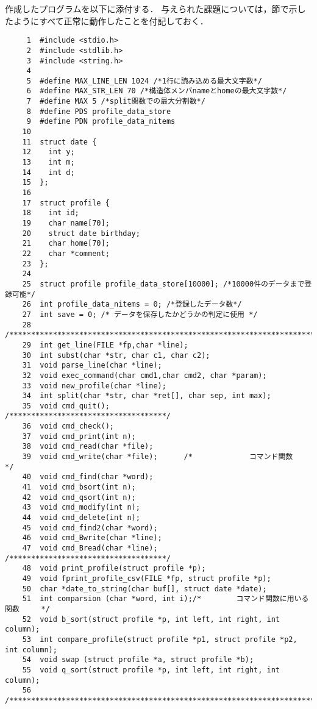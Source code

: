 \documentclass[a4paper,11pt]{jarticle}
\begin{document}
作成したプログラムを以下に添付する．
与えられた課題については，節で示したようにすべて正常に動作したことを付記しておく．
{\fontsize{10pt}{11pt} \selectfont
\begin{verbatim}
     1  #include <stdio.h>
     2  #include <stdlib.h>
     3  #include <string.h>
     4  
     5  #define MAX_LINE_LEN 1024 /*1行に読み込める最大文字数*/
     6  #define MAX_STR_LEN 70 /*構造体メンバnameとhomeの最大文字数*/
     7  #define MAX 5 /*split関数での最大分割数*/
     8  #define PDS profile_data_store
     9  #define PDN profile_data_nitems
    10  
    11  struct date {
    12    int y;
    13    int m;
    14    int d;
    15  };
    16  
    17  struct profile {
    18    int id;
    19    char name[70];
    20    struct date birthday;
    21    char home[70];
    22    char *comment;
    23  };
    24  
    25  struct profile profile_data_store[10000]; /*10000件のデータまで登録可能*/
    26  int profile_data_nitems = 0; /*登録したデータ数*/
    27  int save = 0; /* データを保存したかどうかの判定に使用 */
    28  /*************************************************************************/
    29  int get_line(FILE *fp,char *line);
    30  int subst(char *str, char c1, char c2);
    31  void parse_line(char *line);     
    32  void exec_command(char cmd1,char cmd2, char *param);
    33  void new_profile(char *line);
    34  int split(char *str, char *ret[], char sep, int max);
    35  void cmd_quit();                 /************************************/ 
    36  void cmd_check();
    37  void cmd_print(int n);
    38  void cmd_read(char *file);
    39  void cmd_write(char *file);      /*             コマンド関数           */
    40  void cmd_find(char *word);
    41  void cmd_bsort(int n);
    42  void cmd_qsort(int n);
    43  void cmd_modify(int n);
    44  void cmd_delete(int n);
    45  void cmd_find2(char *word);
    46  void cmd_Bwrite(char *line);
    47  void cmd_Bread(char *line);     /************************************/
    48  void print_profile(struct profile *p);
    49  void fprint_profile_csv(FILE *fp, struct profile *p);
    50  char *date_to_string(char buf[], struct date *date);
    51  int comparsion (char *word, int i);/*        コマンド関数に用いる関数     */
    52  void b_sort(struct profile *p, int left, int right, int column);
    53  int compare_profile(struct profile *p1, struct profile *p2, int column);
    54  void swap (struct profile *a, struct profile *b);
    55  void q_sort(struct profile *p, int left, int right, int column);
    56  /*************************************************************************/

\end{verbatim}}
\end{document}
